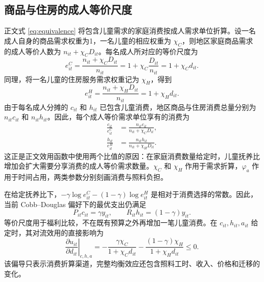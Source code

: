\documentclass[UTF8,a4paper,zihao=-4,fontset=windows]{ctexart}
\numberwithin{equation}{section}
\begin{document}
\subsection{商品与住房的成人等价尺度}
\label{app:equivalence}

正文式 \eqref{eq:equivalence} 将包含儿童需求的家庭消费按成人需求单位折算。设一名成人自身的商品需求权重为1，一名儿童的相应权重为 $\chi_C$，则地区家庭商品需求的成人等价人数为 $n_{it}+\chi_CD_{it}$。每名成人所对应的等价尺度为
\begin{equation}
  e^C_{it}
  =\frac{n_{it}+\chi_CD_{it}}{n_{it}}
  =1+\chi_C\frac{D_{it}}{n_{it}}
  =1+\chi_Cd_{it}.
  \label{eq:app-goods-equivalence}
\end{equation}
同理，将一名儿童的住房服务需求权重记为 $\chi_H$，得到
\begin{equation}
  e^H_{it}
  =\frac{n_{it}+\chi_HD_{it}}{n_{it}}
  =1+\chi_Hd_{it}.
  \label{eq:app-housing-equivalence}
\end{equation}
由于每名成人分摊的 $c_{it}$ 和 $h_{it}$ 已包含儿童消费，地区商品与住房消费总量分别为 $n_{it}c_{it}$ 和 $n_{it}h_{it}$。因此，每个成人等价需求单位享有的消费为
\begin{align}
  \frac{c_{it}}{e^C_{it}}
    &=\frac{n_{it}c_{it}}{n_{it}+\chi_CD_{it}},
    \label{eq:app-equivalent-goods-consumption}\\
  \frac{h_{it}}{e^H_{it}}
    &=\frac{n_{it}h_{it}}{n_{it}+\chi_HD_{it}}.
    \label{eq:app-equivalent-housing-consumption}
\end{align}
这正是正文效用函数中使用两个比值的原因：在家庭消费数量给定时，儿童抚养比增加会扩大需要分享消费的成人等价需求数量。$\chi_C$ 和 $\chi_H$ 作用于需求折算，$\varphi_a$ 作用于时间占用，两类参数分别刻画消费与照料负担。

在给定抚养比下，$-\gamma\log e^C_{it}-(1-\gamma)\log e^H_{it}$ 是相对于消费选择的常数。因此，当前 Cobb--Douglas 偏好下的最优支出仍满足
\begin{equation}
  P_{it}c_{it}=\gamma y_{it},\qquad
  R_{it}h_{it}=(1-\gamma)y_{it}.
  \label{eq:app-equivalence-budget-shares}
\end{equation}
等价尺度用于福利比较，不在既有预算之外再增加一笔儿童消费。在 $c_{it},h_{it},a_{it}$ 给定时，其对流效用的直接影响为
\begin{equation}
  \left.\frac{\partial u_{it}}{\partial d_{it}}\right|_{c,h,a}
  =-\frac{\gamma\chi_C}{1+\chi_Cd_{it}}
   -\frac{(1-\gamma)\chi_H}{1+\chi_Hd_{it}}\leq0.
  \label{eq:app-dependency-utility}
\end{equation}
该偏导只表示消费折算渠道，完整均衡效应还包含照料工时、收入、价格和迁移的变化。
\end{document}
